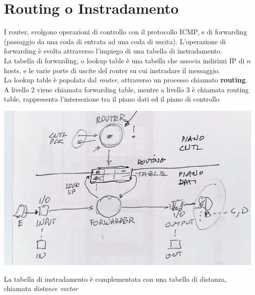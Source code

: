 \documentclass[11pt, oneside]{article}   	%
\begin{document}
\section*{Routing o Instradamento}
I router, svolgono operazioni di controllo con il protocollo ICMP, e di forwarding (passaggio da una coda di entrata ad una coda di uscita). L'operazione di forwarding è svolta attraverso l'impiego di una tabella di instradamento.\\
La tabella di forwarding, o lookup table è una tabella che associa indirizzi IP di $n$ hosts, e le varie porte di uscite del router su cui instradare il messaggio.\\
La lookup table è popolata dal \emph{router}, attraverso un processo chiamato \textbf{routing}.
A livello 2 viene chiamata forwarding table, mentre a livello 3 è chiamata routing table, rappresenta l'intersezione tra il piano dati ed il piano di controllo
\begin{center}
\includegraphics[scale=0.5]{forwarder}
\end{center}
La tabella di instradamento è complementata con una tabella di distanza, chiamata \emph{distance vector}
\end{document}
